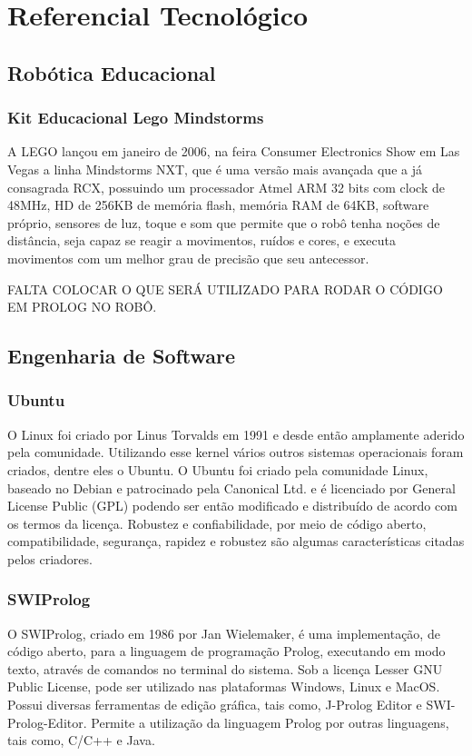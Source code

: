 \chapter{Referencial Tecnológico}

\section{Robótica Educacional}
\subsection{Kit Educacional Lego Mindstorms}
A LEGO lançou em janeiro de 2006, na feira Consumer Electronics Show em Las Vegas a linha Mindstorms NXT, que é uma versão mais avançada que a já consagrada RCX, possuindo um processador Atmel ARM 32 bits com clock de 48MHz, HD de 256KB de memória flash, memória RAM de 64KB, software próprio, sensores de luz, toque e som que permite que o robô tenha noções de distância, seja capaz se reagir a movimentos, ruídos e cores, e executa movimentos com um melhor grau de precisão que seu antecessor.

FALTA COLOCAR O QUE SERÁ UTILIZADO PARA RODAR O CÓDIGO EM PROLOG NO ROBÔ.

\section{Engenharia de Software}
\subsection{Ubuntu}
O Linux foi criado por Linus Torvalds em 1991 e desde então amplamente aderido pela comunidade. Utilizando esse kernel vários outros sistemas operacionais foram criados, dentre eles o Ubuntu. 
O Ubuntu foi criado pela comunidade Linux, baseado no Debian e patrocinado pela Canonical Ltd. e é licenciado por General License Public (GPL) podendo ser então modificado e distribuído de acordo com os termos da licença. Robustez e confiabilidade, por meio de código aberto, compatibilidade, segurança, rapidez e robustez são algumas características citadas pelos criadores. 

\subsection{SWIProlog}
O SWIProlog, criado em 1986 por Jan Wielemaker, é uma implementação, de código aberto, para a linguagem de programação Prolog, executando em modo texto, através de comandos 	no terminal do sistema. Sob a licença Lesser GNU Public License, pode ser utilizado nas plataformas Windows, Linux e MacOS. Possui diversas ferramentas de edição gráfica, tais como, J-Prolog Editor e SWI-Prolog-Editor.
Permite a utilização da linguagem Prolog por outras linguagens, tais como, C/C++ e Java.

